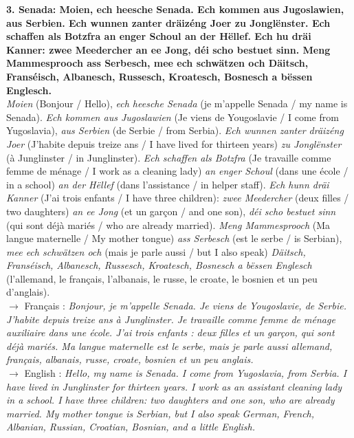 \noindent\textbf{3. Senada: Moien, ech heesche Senada. Ech kommen aus Jugoslawien, aus Serbien. Ech wunnen zanter dräizéng Joer zu Jonglënster. Ech schaffen als Botzfra an enger Schoul an der Hëllef. Ech hu dräi Kanner: zwee Meedercher an ee Jong, déi scho bestuet sinn. Meng Mammesprooch ass Serbesch, mee ech schwätzen och Däitsch, Franséisch, Albanesch, Russesch, Kroatesch, Bosnesch a bëssen Englesch.}\\
\textit{Moien} (Bonjour / Hello), \textit{ech heesche Senada} (je m'appelle Senada / my name is Senada). \textit{Ech kommen aus Jugoslawien} (Je viens de Yougoslavie / I come from Yugoslavia), \textit{aus Serbien} (de Serbie / from Serbia). \textit{Ech wunnen zanter dräizéng Joer} (J'habite depuis treize ans / I have lived for thirteen years) \textit{zu Jonglënster} (à Junglinster / in Junglinster). \textit{Ech schaffen als Botzfra} (Je travaille comme femme de ménage / I work as a cleaning lady) \textit{an enger Schoul} (dans une école / in a school) \textit{an der Hëllef} (dans l'assistance / in helper staff). \textit{Ech hunn dräi Kanner} (J'ai trois enfants / I have three children): \textit{zwee Meedercher} (deux filles / two daughters) \textit{an ee Jong} (et un garçon / and one son), \textit{déi scho bestuet sinn} (qui sont déjà mariés / who are already married). \textit{Meng Mammesprooch} (Ma langue maternelle / My mother tongue) \textit{ass Serbesch} (est le serbe / is Serbian), \textit{mee ech schwätzen och} (mais je parle aussi / but I also speak) \textit{Däitsch, Franséisch, Albanesch, Russesch, Kroatesch, Bosnesch a bëssen Englesch} (l'allemand, le français, l'albanais, le russe, le croate, le bosnien et un peu d'anglais).\\
$\rightarrow$ Français : \textit{Bonjour, je m'appelle Senada. Je viens de Yougoslavie, de Serbie. J'habite depuis treize ans à Junglinster. Je travaille comme femme de ménage auxiliaire dans une école. J'ai trois enfants : deux filles et un garçon, qui sont déjà mariés. Ma langue maternelle est le serbe, mais je parle aussi allemand, français, albanais, russe, croate, bosnien et un peu anglais.}\\
$\rightarrow$ English : \textit{Hello, my name is Senada. I come from Yugoslavia, from Serbia. I have lived in Junglinster for thirteen years. I work as an assistant cleaning lady in a school. I have three children: two daughters and one son, who are already married. My mother tongue is Serbian, but I also speak German, French, Albanian, Russian, Croatian, Bosnian, and a little English.}\\[0.5em]

